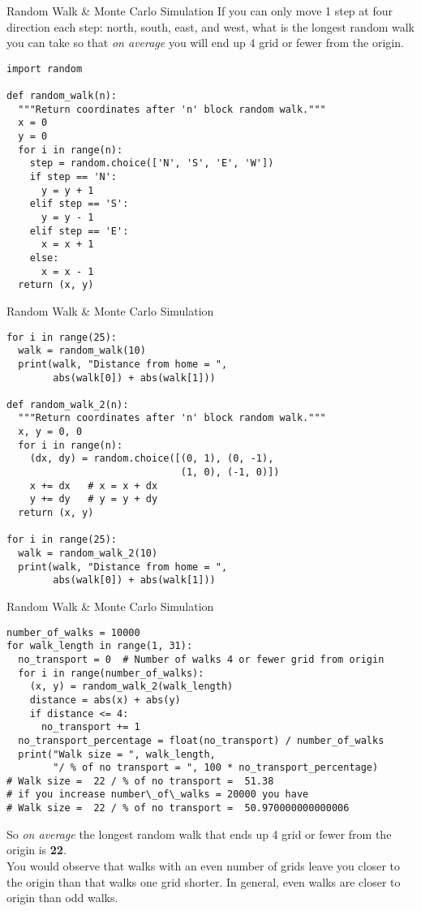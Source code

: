 \documentclass{beamer}
\begin{document}
\begin{frame}[fragile]{Random Walk \& Monte Carlo Simulation} \vspace{1em}
If you can only move 1 step at four direction each step: 
north, south, east, and west, what is the longest random walk 
you can take so that \textit{on average} you will end up 4 
grid or fewer from the origin. \vspace{-.5em}
\begin{verbatim}
import random

def random_walk(n):
  """Return coordinates after 'n' block random walk."""
  x = 0
  y = 0
  for i in range(n):
    step = random.choice(['N', 'S', 'E', 'W'])
    if step == 'N':
      y = y + 1
    elif step == 'S':
      y = y - 1
    elif step == 'E':
      x = x + 1
    else:
      x = x - 1
  return (x, y)
\end{verbatim}
\end{frame}

\begin{frame}[fragile]{Random Walk \& Monte Carlo Simulation}
\begin{verbatim}
for i in range(25):
  walk = random_walk(10)
  print(walk, "Distance from home = ",
        abs(walk[0]) + abs(walk[1]))

def random_walk_2(n):
  """Return coordinates after 'n' block random walk."""
  x, y = 0, 0
  for i in range(n):
    (dx, dy) = random.choice([(0, 1), (0, -1), 
                              (1, 0), (-1, 0)])
    x += dx   # x = x + dx
    y += dy   # y = y + dy
  return (x, y)

for i in range(25):
  walk = random_walk_2(10)
  print(walk, "Distance from home = ",
        abs(walk[0]) + abs(walk[1]))
\end{verbatim}
\end{frame}

\begin{frame}[fragile]{Random Walk \& Monte Carlo Simulation}
\begin{verbatim}
number_of_walks = 10000
for walk_length in range(1, 31):
  no_transport = 0  # Number of walks 4 or fewer grid from origin
  for i in range(number_of_walks):
    (x, y) = random_walk_2(walk_length)
    distance = abs(x) + abs(y)
    if distance <= 4:
      no_transport += 1
  no_transport_percentage = float(no_transport) / number_of_walks
  print("Walk size = ", walk_length,
        "/ % of no transport = ", 100 * no_transport_percentage)
# Walk size =  22 / % of no transport =  51.38
# if you increase number\_of\_walks = 20000 you have
# Walk size =  22 / % of no transport =  50.970000000000006
\end{verbatim}
\scriptsize{So \textit{on average} the longest random walk that ends up 4 grid 
or fewer from the origin is \textbf{22}. \\
You would observe that walks with an even number of grids leave 
you closer to the origin than that walks one grid shorter. In 
general, even walks are closer to origin than odd walks.}
\end{frame}
\end{document}

